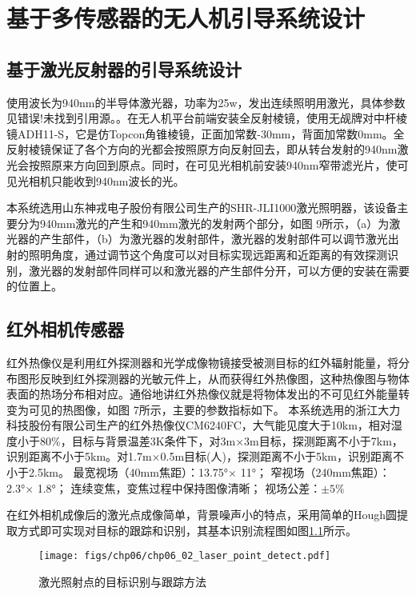\chapter{基于多传感器的无人机引导系统设计}

\section{基于激光反射器的引导系统设计}

使用波长为940nm的半导体激光器，功率为25w，发出连续照明用激光，具体参数见错误!未找到引用源。。在无人机平台前端安装全反射棱镜，使用无觇牌对中杆棱镜ADH11-S，它是仿Topcon角锥棱镜，正面加常数-30mm，背面加常数0mm。全反射棱镜保证了各个方向的光都会按照原方向反射回去，即从转台发射的940nm激光会按照原来方向回到原点。同时，在可见光相机前安装940nm窄带滤光片，使可见光相机只能收到940nm波长的光。

本系统选用山东神戎电子股份有限公司生产的SHR-JLI1000激光照明器，该设备主要分为940mm激光的产生和940mm激光的发射两个部分，如图 9所示，（a）为激光器的产生部件，（b）为激光器的发射部件，激光器的发射部件可以调节激光出射的照明角度，通过调节这个角度可以对目标实现远距离和近距离的有效探测识别，激光器的发射部件同样可以和激光器的产生部件分开，可以方便的安装在需要的位置上。

\section{红外相机传感器}
红外热像仪是利用红外探测器和光学成像物镜接受被测目标的红外辐射能量，将分布图形反映到红外探测器的光敏元件上，从而获得红外热像图，这种热像图与物体表面的热场分布相对应。通俗地讲红外热像仪就是将物体发出的不可见红外能量转变为可见的热图像，如图 7所示，主要的参数指标如下。
本系统选用的浙江大力科技股份有限公司生产的红外热像仪CM6240FC，大气能见度大于10km，相对湿度小于$80\%$，目标与背景温差3K条件下，对3m×3m目标，探测距离不小于7km，识别距离不小于5km。对1.7m×0.5m目标(人)，探测距离不小于5km，识别距离不小于2.5km。
最宽视场（40mm焦距）：13.75°× 11°；
窄视场（240mm焦距）：2.3°× 1.8°；
连续变焦，变焦过程中保持图像清晰；
视场公差：$±5\%$

在红外相机成像后的激光点成像简单，背景噪声小的特点，采用简单的Hough圆提取方式即可实现对目标的跟踪和识别，其基本识别流程图如图\ref{fig:chp06_02_laser_point_detect}所示。
\begin{figure}[!th]
	\centering
	\texttt{[image: figs/chp06/chp06\_02\_laser\_point\_detect.pdf]}	
	\caption{激光照射点的目标识别与跟踪方法}
	\label{fig:chp06_02_laser_point_detect}
\end{figure}

